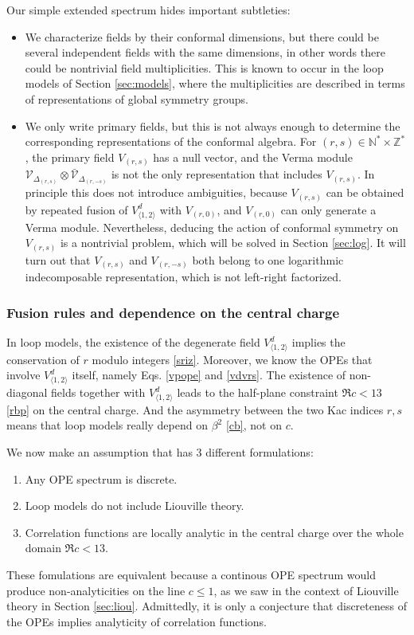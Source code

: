 \documentclass[12pt, a4paper]{article}
\theoremstyle{break}
\begin{document}
Our simple extended spectrum hides important subtleties: 
\begin{itemize}
 \item We characterize fields by their conformal dimensions, but there could be several independent fields with the same dimensions, in other words there could be nontrivial field multiplicities. This is known to occur in the loop models of Section \ref{sec:models}, where the multiplicities are described in terms of representations of global symmetry groups.  
 \item We only write primary fields, but this is not always enough to determine the corresponding representations of the conformal algebra. For $(r,s)\in \mathbb{N}^*\times \mathbb{Z}^*$, the primary field $V_{(r,s)}$ has a null vector, and the Verma module $\mathcal{V}_{\Delta_{(r,s)}}\otimes\bar{\mathcal{V}}_{\Delta_{(r,-s)}}$ is not the only representation that includes $V_{(r,s)}$. In principle this does not introduce ambiguities, because $V_{(r,s)}$ can be obtained by repeated fusion of $V^d_{\langle 1,2\rangle}$ with $V_{(r,0)}$, and $V_{(r,0)}$ can only generate a Verma module. Nevertheless, deducing the action of conformal symmetry on $V_{(r,s)}$ is a nontrivial problem, which will be solved in Section \ref{sec:log}. It will turn out that $V_{(r,s)}$ and $V_{(r,-s)}$ both belong to one logarithmic indecomposable representation, which is not left-right factorized. 
\end{itemize}

\subsubsection{Fusion rules and dependence on the central charge}

In loop models, the existence of the degenerate field $V^d_{\langle 1,2\rangle}$ implies the conservation of $r$ modulo integers \eqref{sriz}. Moreover, we know the OPEs that involve $V^d_{\langle 1,2\rangle}$ itself, namely Eqs. \eqref{vpope} and \eqref{vdvrs}. The existence of non-diagonal fields together with $V^d_{\langle 1,2\rangle}$ leads to the half-plane constraint $\Re c<13$ \eqref{rbp} on the central charge. And the asymmetry between the two Kac indices $r,s$ means that loop models really depend on $\beta^2$ \eqref{cb}, not on $c$. 

We now make an assumption that has 3 different formulations:
\begin{enumerate}
 \item Any OPE spectrum is discrete.
 \item Loop models do not include Liouville theory. 
 \item Correlation functions are locally analytic in the central charge over the whole domain $\Re c<13$.
\end{enumerate}
These fomulations are equivalent because a continous OPE spectrum would produce non-analyticities on the line $c\leq 1$, as we saw in the context of Liouville theory in Section \ref{sec:liou}. Admittedly, it is only a conjecture that discreteness of the OPEs implies analyticity of correlation functions.
\end{document}
